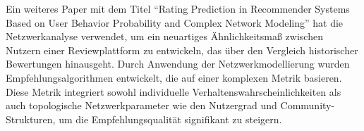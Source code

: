 Ein weiteres Paper mit dem Titel \enquote{Rating Prediction in Recommender Systems Based on User Behavior Probability and Complex Network Modeling} hat die Netzwerkanalyse verwendet, um ein neuartiges Ähnlichkeitsmaß zwischen Nutzern einer Reviewplattform zu entwickeln, das über den Vergleich historischer Bewertungen hinausgeht.
Durch Anwendung der Netzwerkmodellierung wurden Empfehlungsalgorithmen entwickelt, die auf einer komplexen Metrik basieren.
Diese Metrik integriert sowohl individuelle Verhaltenswahrscheinlichkeiten als auch topologische Netzwerkparameter wie den Nutzergrad und Community-Strukturen, um die Empfehlungsqualität signifikant zu steigern. \parencite{su2021rating}